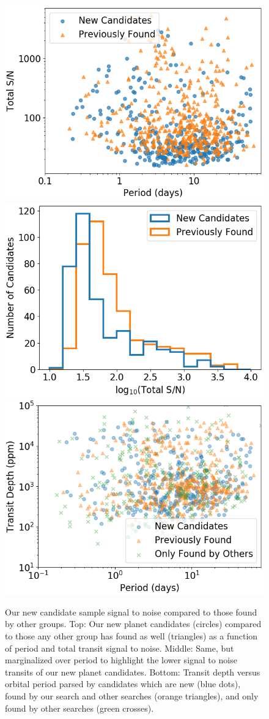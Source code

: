 \documentclass[twocolumn]{aastex62}
\begin{document}
\begin{figure}[tbp]
\centering
\includegraphics[width=0.8\columnwidth]{other_searches.png}
\includegraphics[width=0.8\columnwidth]{other_searches_hist.png}
\includegraphics[width=0.8\columnwidth]{depth_compare.png}
\caption{Our new candidate sample signal to noise compared to those
  found by other groups. Top: Our new planet candidates (circles)
  compared to those any other group has found as well (triangles) as a
  function of period and total transit signal to noise. Middle: Same,
  but marginalized over period to highlight the lower signal to noise
  transits of our new planet candidates. Bottom: Transit depth versus
  orbital period parsed by candidates which are new (blue dots), found
  by our search and other searches (orange triangles), and only found
  by other searches (green crosses). \label{other_searches}}
\end{figure}
\end{document}
